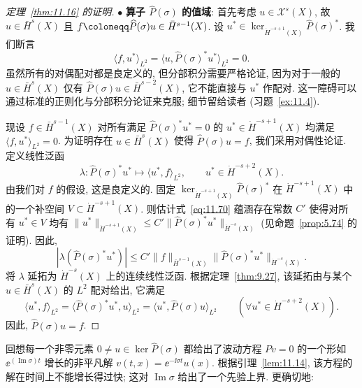 \begin{proof}[定理~\ref{thm:11.16} 的证明]
\noindent $\bullet$ \textbf{算子 $\widehat{P}(\sigma)$ 的值域}:
首先考虑 $u \in \mathcal{X}^s(X)$, 故 $u \in \bar H^s(X)$ 且 $f \defeq \widehat{P}(\sigma) u \in \bar H^{s-1}(X)$. 设 $u^* \in \ker_{\dot H^{-s+1}(X)} \widehat{P}(\sigma)^*$. 我们断言
\begin{equation}\label{eq:11.71}
    \langle f, u^* \rangle_{L^2} = \langle u, \widehat{P}(\sigma)^* u^* \rangle_{L^2} = 0.
\end{equation}
虽然所有的对偶配对都是良定义的, 但分部积分需要严格论证, 因为对于一般的 $u \in \bar H^s(X)$ 仅有 $\widehat{P}(\sigma) u \in \bar H^{s-2}(X)$, 它不能直接与 $u^*$ 作配对. 这一障碍可以通过标准的正则化与分部积分论证来克服; 细节留给读者 (习题~\ref{ex:11.4}).

现设 $f \in \bar H^{s-1}(X)$ 对所有满足 $\widehat{P}(\sigma)^* u^* = 0$ 的 $u^* \in \dot H^{-s+1}(X)$ 均满足 $\langle f, u^* \rangle_{L^2} = 0$. 为证明存在 $u \in \bar H^s(X)$ 使得 $\widehat{P}(\sigma) u = f$, 我们采用对偶性论证. 定义线性泛函
\begin{equation}\label{eq:11.72}
    \lambda \colon \widehat{P}(\sigma)^* u^* \mapsto \langle u^*, f \rangle_{L^2}, \qquad u^* \in \dot H^{-s+2}(X).
\end{equation}
由我们对 $f$ 的假设, 这是良定义的. 固定 $\ker_{\dot H^{-s+1}(X)} \widehat{P}(\sigma)^*$ 在 $\dot H^{-s+1}(X)$ 中的一个补空间 $V \subset \dot H^{-s+1}(X)$. 则估计式~\eqref{eq:11.70} 蕴涵存在常数 $C'$ 使得对所有 $u^* \in V$ 均有 $\|u^*\|_{\dot H^{-s+1}(X)} \le C' \|\widehat{P}(\sigma)^* u^*\|_{\dot H^{-s}(X)}$ (见命题~\ref{prop:5.74} 的证明). 因此,
\begin{equation}\label{eq:11.73}
    |\lambda(\widehat{P}(\sigma)^* u^*)| \le C' \|f\|_{\bar H^{s-1}(X)} \|\widehat{P}(\sigma)^* u^*\|_{\dot H^{-s}(X)}.
\end{equation}
将 $\lambda$ 延拓为 $\dot H^{-s}(X)$ 上的连续线性泛函. 根据定理~\ref{thm:9.27}, 该延拓由与某个 $u \in \bar H^s(X)$ 的 $L^2$ 配对给出, 它满足
\begin{equation}\label{eq:11.74}
    \langle u^*, f \rangle_{L^2} = \langle \widehat{P}(\sigma)^* u^*, u \rangle_{L^2} = \langle u^*, \widehat{P}(\sigma) u \rangle_{L^2} \qquad (\forall u^* \in \dot H^{-s+2}(X)).
\end{equation}
因此, $\widehat{P}(\sigma) u = f$.
\end{proof}

回想每一个非零元素 $0 \neq u \in \ker \widehat{P}(\sigma)$ 都给出了波动方程 $P v = 0$ 的一个形如 $\ee^{(\operatorname{Im}\sigma)t}$ 增长的非平凡解 $v(t, x) = \ee^{-\ii \sigma t} u(x)$. 根据引理~\ref{lem:11.14}, 该方程的解在时间上不能增长得过快; 这对 $\operatorname{Im}\sigma$ 给出了一个先验上界. 更确切地:

